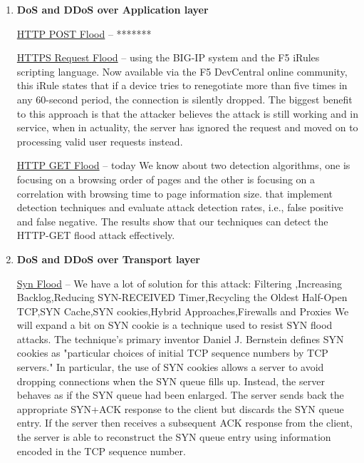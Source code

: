 \documentclass{article}
\begin{document}
\begin{enumerate}

\item \textbf{ DoS and DDoS over Application layer}
 

 \hfill \break \underline{HTTP POST Flood} – *******

 \hfill \break\underline{HTTPS Request Flood} – using the BIG-IP system and the F5 iRules scripting language.
Now available via the F5 DevCentral online community, this iRule states that if a device tries to renegotiate more than five times in any 60-second period, the connection is silently dropped.
The biggest benefit to this approach is that the attacker believes the attack is still working and in service, when in actuality, the server has ignored the request and moved on to processing valid user requests instead.


 \hfill \break\underline{HTTP GET Flood} – today We know about two detection algorithms, one is focusing on a browsing order of pages and the other is focusing on a correlation with browsing time to page information size. that implement detection techniques and evaluate attack detection rates, i.e., false positive and false negative. The results show that our techniques can detect the HTTP-GET flood attack effectively.


\item \textbf{DoS and DDoS over Transport layer} 

 \hfill \break \underline{Syn Flood} – We have a lot of solution for this attack:
Filtering ,Increasing Backlog,Reducing SYN-RECEIVED Timer,Recycling the Oldest Half-Open TCP,SYN Cache,SYN cookies,Hybrid Approaches,Firewalls and Proxies
We will expand a bit on SYN cookie is a technique used to resist SYN flood attacks. The technique's primary inventor Daniel J. Bernstein defines SYN cookies as "particular choices of initial TCP sequence numbers by TCP servers." In particular, the use of SYN cookies allows a server to avoid dropping connections when the SYN queue fills up. Instead, the server behaves as if the SYN queue had been enlarged. The server sends back the appropriate SYN+ACK response to the client but discards the SYN queue entry. If the server then receives a subsequent ACK response from the client, the server is able to reconstruct the SYN queue entry using information encoded in the TCP sequence number.


\end{enumerate}
\end{document}
